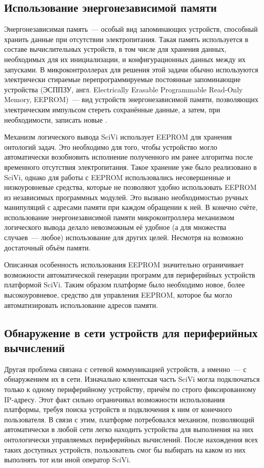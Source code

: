 \subsection{Использование энергонезависимой памяти}

Энергонезависимая память~--- особый вид запоминающих устройств, способный хранить данные при отсутствии электропитания.
Такая память используется в составе вычислительных устройств, в том числе для хранения данных, необходимых для их инициализации, и конфигурационных данных между их запусками.
В микроконтроллерах для решения этой задачи обычно используются электрически стираемые перепрограммируемые постоянные запоминающие устройства (ЭСППЗУ, англ. Electrically Erasable Programmable Read-Only Memory, EEPROM)~--- вид устройств энергонезависимой памяти, позволяющих электрическим импульсом стереть сохранённые данные, а затем, при необходимости, записать новые \cite{incollection:eeprom-proposal, article:eeprom}.

Механизм логического вывода SciVi использует EEPROM для хранения онтологий задач.
Это необходимо для того, чтобы устройство могло автоматически возобновить исполнение полученного им ранее алгоритма после временного отсутствия электропитания.
Такое хранение уже было реализовано в SciVi, однако для работы с EEPROM использовались несовершенные и низкоуровневые средства, которые не позволяют удобно использовать EEPROM из независимых программных модулей.
Это вызвано необходимостью ручных манипуляций с адресами памяти при каждом обращении к ней.
В конечно счёте, использование энергонезависимой памяти микроконтроллера механизмом логического вывода делало невозможным её удобное (а для множества случаев~--- любое) использование для других целей.
Несмотря на возможно достаточный объём памяти.

Описанная особенность использования EEPROM значительно ограничивает возможности автоматической генерации программ для периферийных устройств платформой SciVi.
Таким образом платформе было необходимо новое, более высокоуровневое, средство для управления EEPROM, которое бы могло автоматизировать использование адресов памяти.

\subsection{Обнаружение в сети устройств для периферийных вычислений}

Другая проблема связана с сетевой коммуникацией устройств, а именно~--- с обнаружением их в сети.
Изначально клиентская часть SciVi могла подключаться только к одному периферийному устройству, причём по строго фиксированному IP-адресу.
Этот факт сильно ограничивал возможности использования платформы, требуя поиска устройств и подключения к ним от конечного пользователя.
В связи с этим, платформе потребовался механизм, позволяющий автоматически в любой сети легко находить устройства для выполнения на них онтологически управляемых периферийных вычислений.
После нахождения всех таких доступных устройств, пользователь смог бы выбирать на каком из них выполнять тот или иной оператор SciVi.

